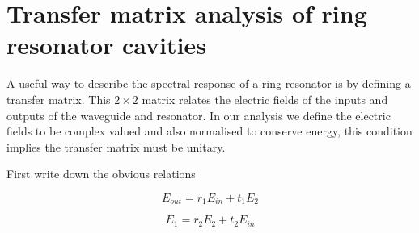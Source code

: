 \section{Transfer matrix analysis of ring resonator cavities}
A useful way to describe the spectral response of a ring resonator is by defining a transfer matrix. This $2\times2$ matrix relates the electric fields of the inputs and outputs of the waveguide and resonator. In our analysis we define the electric fields to be complex valued and also normalised to conserve energy, this condition implies the transfer matrix must be unitary.

First write down the obvious relations

\begin{equation}
E_{out}=r_1E_{in}+t_1E_2
\end{equation}

\begin{equation}
E_{1}=r_2E_2+t_2E_{in}
\end{equation}

